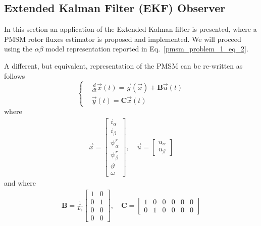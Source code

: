 \documentclass[11pt,a4paper,oneside]{book}
\numberwithin{equation}{section}
\theoremstyle{it}
\theoremstyle{definition}
\begin{document}
\subsection{Extended Kalman Filter (EKF) Observer}\label{PMSM_EKF}
In this section an application of the Extended Kalman filter is presented, where a PMSM rotor fluxes estimator is proposed and implemented. We will proceed using the  $\alpha\beta$ model representation reported in Eq.~\eqref{pmsm_problem_1_eq_2}. 

A different, but equivalent, representation of the PMSM can be re-written as follows
\begin{equation}\label{pmsm_problem_1_eq_5}
	\left\lbrace \begin{aligned}
		&\frac{d}{dt}\vec{x}(t)=\vec{g}(\vec{x})+\mathbf{B}\vec{u}(t)
		\\[6pt]
		&\vec{y}(t) = \mathbf{C}\vec{x}(t)
	\end{aligned}\right. 
\end{equation} 
where 
\begin{equation}\label{pmsm_problem_1_eq_6}
	\begin{aligned}
		\vec{x}=\begin{bmatrix} i_\alpha \\[6pt] i_\beta \\[6pt] \psi_\alpha^r 
			\\[6pt] \psi_\beta^r \\[6pt] \vartheta \\[6pt] \omega \end{bmatrix},\quad
		\vec{u}=\begin{bmatrix} u_\alpha \\[6pt] u_\beta \end{bmatrix}
	\end{aligned}
\end{equation}
and where
\begin{equation}\label{pmsm_problem_1_eq_7}
	\begin{aligned}
		\mathbf{B} = \frac{1}{L_s}\begin{bmatrix} 1&0 \\[6pt] 
			0&1\\[6pt] 0&0 \\[6pt] 0&0  \end{bmatrix},\quad
		\mathbf{C} = \begin{bmatrix} 1&0&0&0&0&0 \\[6pt] 0&1&0&0&0&0 
		\end{bmatrix}
	\end{aligned}
\end{equation} 
\end{document}
